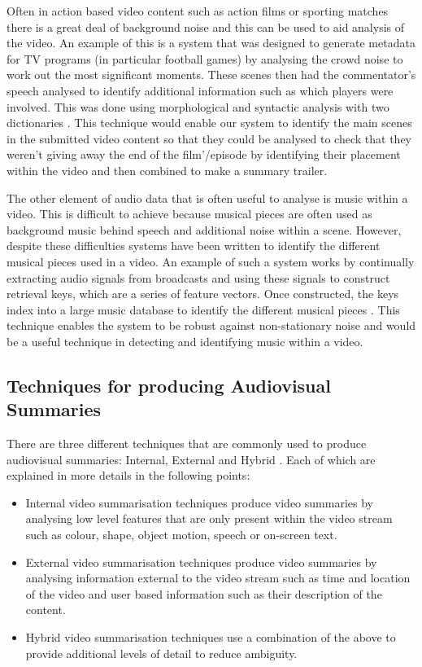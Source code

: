 Often in action based video content such as action films or sporting matches there is a great deal of background noise and this can be used to aid analysis of the video. An example of this is a system that was designed to generate metadata for TV programs (in particular football games) by analysing the crowd noise to work out the most significant moments. These scenes then had the commentator’s speech analysed to identify additional information such as which players were involved. This was done using morphological and syntactic analysis with two dictionaries \cite{AcousticMetadata}. This technique would enable our system to identify the main scenes in the submitted video content so that they could be analysed to check that they weren’t giving away the end of the film’/episode by identifying their placement within the video and then combined to make a summary trailer. 

The other element of audio data that is often useful to analyse is music within a video. This is difficult to achieve because musical pieces are often used as background music behind speech and additional noise within a scene. However, despite these difficulties systems have been written to identify the different musical pieces used in a video.  An example of such a system works by continually extracting audio signals from broadcasts and using these signals to construct retrieval keys, which are a series of feature vectors. Once constructed, the keys index into a large music database to identify the different musical pieces \cite{BackgroundMusic}. This technique enables the system to be robust against non-stationary noise and would be a useful technique in detecting and identifying music within a video.

\subsection{Techniques for producing Audiovisual Summaries}
\label{sec:techniques}
There are three different techniques that are commonly used to produce audiovisual summaries: Internal, External and Hybrid \cite{elvis}. Each of which are explained in more details in the following points:

\begin{itemize}
	\item{Internal video summarisation techniques produce video summaries by analysing low level features that are only present within the video stream such as colour, shape, object motion, speech or on-screen text.}
	\item{External video summarisation techniques produce video summaries by analysing information external to the video stream such as time and location of the video and user based information such as their description of the content.} 
	\item{Hybrid video summarisation techniques use a combination of the above to provide additional levels of detail to reduce ambiguity.}
\end{itemize}

